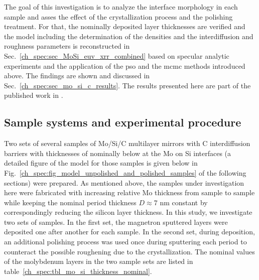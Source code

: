 The goal of this investigation is to analyze the interface morphology in each sample and asses the effect of the crystallization process and the polishing treatment. For that, the nominally deposited layer thicknesses are verified and the model including the determination of the densities and the interdiffusion and roughness parameters is reconstructed in Sec.~\ref{ch_spec:sec_MoSi_euv_xrr_combined} based on specular analytic experiments and the application of the \gls{pso} and the \gls{mcmc} methods introduced above. The findings are shown and discussed in Sec.~\ref{ch_spec:sec_mo_si_c_results}. The results presented here are part of the published work in .

\subsection{Sample systems and experimental procedure} \label{ch_spec:sec_mo_si_c_sample_systems_and_experimental}
Two sets of several samples of Mo/Si/C multilayer mirrors with C interdiffusion barriers with thicknesses of nominally below  at the Mo on Si interfaces (a detailed figure of the model for those samples is given below in Fig.~\ref{ch_spec:fig_model_unpolished_and_polished_samples} of the following sections) were prepared. As mentioned above, the samples under investigation here were fabricated with increasing relative Mo thickness from sample to sample while keeping the nominal period thickness $D\approx 7$ nm constant by correspondingly reducing the silicon layer thickness. In this study, we investigate two sets of samples. In the first set, the magnetron sputtered layers were deposited one after another for each sample. In the second set, during deposition, an additional polishing process was used once during sputtering each period to counteract the possible roughening due to the crystallization. The nominal values of the molybdenum layers in the two sample sets are listed in table~\ref{ch_spec:tbl_mo_si_thickness_nominal}.
